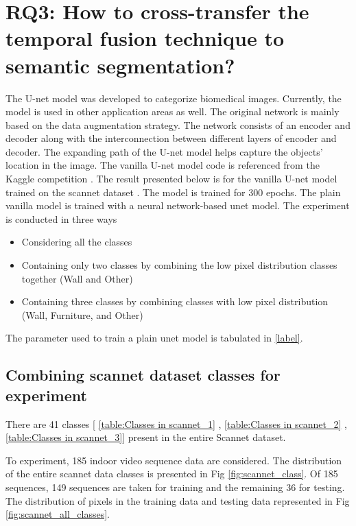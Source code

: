     \section{RQ3: How to cross-transfer the temporal fusion technique to semantic segmentation?}
    
    The U-net model was developed to categorize biomedical images. Currently, the model is used in other application areas as well. The original network is mainly based on the data augmentation strategy. The network consists of an encoder and decoder along with the interconnection between different layers of encoder and decoder. The expanding path of the U-net model helps capture the objects' location in the image. The vanilla U-net model code is referenced from the Kaggle competition \cite{85_kag_challenge}. The result presented below is for the vanilla U-net model trained on the scannet dataset \cite{79_dai2017scannet}. The model is trained for 300 epochs. The plain vanilla model is trained with a neural network-based unet model. The experiment is conducted in three ways
    \begin{itemize}
    	\item Considering all the classes
    	\item Containing only two classes by combining the low pixel distribution classes together (Wall and Other)
    	\item Containing three classes by combining classes with low pixel distribution (Wall, Furniture, and Other)
    \end{itemize}
    
    
    The parameter used to train a plain unet model is tabulated in \ref{label}.
    
    \subsection{Combining scannet dataset classes for experiment}
    
	There are 41 classes [ \ref{table:Classes in scannet_1} , \ref{table:Classes in scannet_2} , \ref{table:Classes in scannet_3}] present in the entire Scannet dataset. 

	To experiment, 185 indoor video sequence data are considered. The distribution of the entire scannet data classes is presented in Fig \ref{fig:scannet_class}. Of 185 sequences, 149 sequences are taken for training and the remaining 36 for testing. The distribution of pixels in the training data and testing data represented in Fig \ref{fig:scannet_all_classes}.
	
